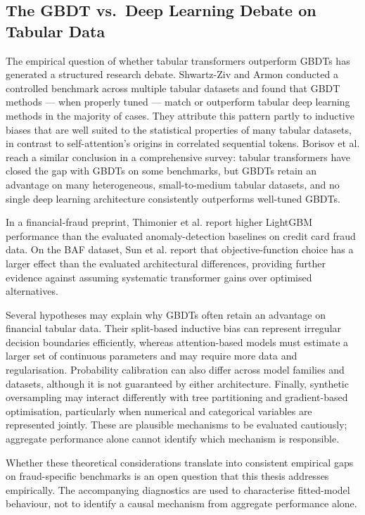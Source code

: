 \subsection{The GBDT vs.\ Deep Learning Debate on Tabular Data}
\label{subsec:sota-dl-gbdt-debate}

The empirical question of whether tabular transformers outperform GBDTs has generated a structured research debate. Shwartz-Ziv and Armon \cite{shwartzziv2022tabular} conducted a controlled benchmark across multiple tabular datasets and found that GBDT methods — when properly tuned — match or outperform tabular deep learning methods in the majority of cases. They attribute this pattern partly to inductive biases that are well suited to the statistical properties of many tabular datasets, in contrast to self-attention's origins in correlated sequential tokens. Borisov et al. \cite{borisov2022deep} reach a similar conclusion in a comprehensive survey: tabular transformers have closed the gap with GBDTs on some benchmarks, but GBDTs retain an advantage on many heterogeneous, small-to-medium tabular datasets, and no single deep learning architecture consistently outperforms well-tuned GBDTs.

In a financial-fraud preprint, Thimonier et al. \cite{thimonier2024comparative} report higher LightGBM performance than the evaluated anomaly-detection baselines on credit card fraud data. On the BAF dataset, Sun et al. \cite{sun2025objective} report that objective-function choice has a larger effect than the evaluated architectural differences, providing further evidence against assuming systematic transformer gains over optimised alternatives.

Several hypotheses may explain why GBDTs often retain an advantage on financial tabular data. Their split-based inductive bias can represent irregular decision boundaries efficiently, whereas attention-based models must estimate a larger set of continuous parameters and may require more data and regularisation. Probability calibration can also differ across model families and datasets, although it is not guaranteed by either architecture. Finally, synthetic oversampling may interact differently with tree partitioning and gradient-based optimisation, particularly when numerical and categorical variables are represented jointly. These are plausible mechanisms to be evaluated cautiously; aggregate performance alone cannot identify which mechanism is responsible.

Whether these theoretical considerations translate into consistent empirical gaps on fraud-specific benchmarks is an open question that this thesis addresses empirically. The accompanying diagnostics are used to characterise fitted-model behaviour, not to identify a causal mechanism from aggregate performance alone.

